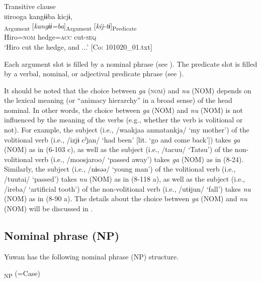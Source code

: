 \ex Transitive clause\\\label{ex:4.1b}
\glll    \textsc  hirooga  kangɨɨba  kicjɨ,\\
      [\textit{hiroo=ga}]\textsubscript{Argument}  [\textit{kangɨɨ=ba}]\textsubscript{Argument}  [\textit{kij-tɨ}]\textsubscript{Predicate}\\
      Hiro=\textsc{nom}  hedge=\textsc{acc}  cut-\textsc{seq}\\
      \glt       ‘Hiro cut the hedge, and ...’ [Co: 101020\_01.txt]
    \z
\z

Each argument slot is filled by a nominal phrase (see ). The predicate slot is filled by a verbal, nominal, or adjectival predicate phrase (see ).

It should be noted that the choice between \textit{ga} (\textsc{nom}) and \textit{nu} (NOM) depends on the lexical meaning (or “animacy hierarchy” in a broad sense) of the head nominal. In other words, the choice between \textit{ga} (NOM) and \textit{nu} (NOM) is not influenced by the meaning of the verbs (e.g., whether the verb is volitional or not). For example, the subject (i.e., /waakjaa anmatankja/ ‘my mother’) of the volitional verb (i.e., /izjɨ cˀjan/ ‘had been’ [lit. ‘go and come back’]) takes \textit{ga} (NOM) as in (6-103 c), as well as the subject (i.e., /tacuu/ ‘Tatsu’) of the non-volitional verb (i.e., /moosjaroo/ ‘passed away’) takes \textit{ga} (NOM) as in (8-24). Similarly, the subject (i.e., /nɨsəə/ ‘young man’) of the volitional verb (i.e., /tuutai/ ‘passed’) takes \textit{nu} (NOM) as in (8-118 a), as well as the subject (i.e., /ireba/ ‘artificial tooth’) of the non-volitional verb (i.e., /utɨjun/ ‘fall’) takes \textit{nu} (NOM) as in (8-90 a). The details about the choice between \textit{ga} (NOM) and \textit{nu} (NOM) will be discussed in .

\subsection{Nominal phrase (NP)}\label{sec:4.1.2}

Yuwan has the following nominal phrase (NP) structure.

\ea{}\textsubscript{NP}\textit{\textsubscript{} }(=Case)
\z

